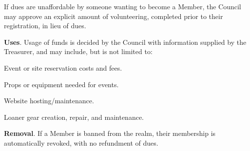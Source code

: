 \documentclass[12pt]{article}
\begin{document}
\begin{level}
\begin{level}
        \item If dues are unaffordable by someone wanting to become a Member, the Council may approve an explicit amount of volunteering, completed prior to their registration, in lieu of dues.
    \end{level}
    \item \textbf{Uses}. Usage of funds is decided by the Council with information supplied by the Treasurer, and may include, but is not limited to:
    \begin{level}
        \item Event or site reservation costs and fees.
        \item Props or equipment needed for events.
        \item Website hosting/maintenance.
        \item Loaner gear creation, repair, and maintenance.
    \end{level}
    \item \textbf{Removal}. If a Member is banned from the realm, their membership is automatically revoked, with no refundment of dues.
\end{level}

\end{document}
